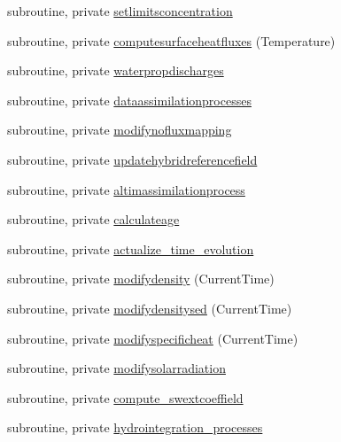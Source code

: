 \begin{DoxyCompactItemize}
\item 
subroutine, private \mbox{\hyperlink{namespacemodulewaterproperties_abf8fd0a88a0f3e9bf66064666c864915}{setlimitsconcentration}}
\item 
subroutine, private \mbox{\hyperlink{namespacemodulewaterproperties_a772748e5406dcfadf1087f66a9622a83}{computesurfaceheatfluxes}} (Temperature)
\item 
subroutine, private \mbox{\hyperlink{namespacemodulewaterproperties_a1198b9575d74a6939f38dcaa6c63f476}{waterpropdischarges}}
\item 
subroutine, private \mbox{\hyperlink{namespacemodulewaterproperties_abdbc309080b92eb5274f0481166c683d}{dataassimilationprocesses}}
\item 
subroutine, private \mbox{\hyperlink{namespacemodulewaterproperties_a3d30e149ea4b3528ce74dea8162b347f}{modifynofluxmapping}}
\item 
subroutine, private \mbox{\hyperlink{namespacemodulewaterproperties_a352c7f22b34ddac5b3bada0a33cd7221}{updatehybridreferencefield}}
\item 
subroutine, private \mbox{\hyperlink{namespacemodulewaterproperties_a372e37e94ca0415d98cc92c58dc4957b}{altimassimilationprocess}}
\item 
subroutine, private \mbox{\hyperlink{namespacemodulewaterproperties_a93266e9cb4d7560fc55136ac596e1c35}{calculateage}}
\item 
subroutine, private \mbox{\hyperlink{namespacemodulewaterproperties_afcd5345e3a92fad8129c23c999e18873}{actualize\+\_\+time\+\_\+evolution}}
\item 
subroutine, private \mbox{\hyperlink{namespacemodulewaterproperties_a7727e3b2ffd1b7f1c501dc60cf64c723}{modifydensity}} (Current\+Time)
\item 
subroutine, private \mbox{\hyperlink{namespacemodulewaterproperties_a430bfd6acd72693785ebf7d3e3a9dea8}{modifydensitysed}} (Current\+Time)
\item 
subroutine, private \mbox{\hyperlink{namespacemodulewaterproperties_ac377b27826c6ced4a835d6e47384f917}{modifyspecificheat}} (Current\+Time)
\item 
subroutine, private \mbox{\hyperlink{namespacemodulewaterproperties_a53a84226a2a46ab704fec5883bc4639a}{modifysolarradiation}}
\item 
subroutine, private \mbox{\hyperlink{namespacemodulewaterproperties_aa1d438c16bd8399614f3b5058f6a58e8}{compute\+\_\+swextcoeffield}}
\item 
subroutine, private \mbox{\hyperlink{namespacemodulewaterproperties_a9766d3375543a27f75f30630ffe87795}{hydrointegration\+\_\+processes}}

\end{DoxyCompactItemize}
